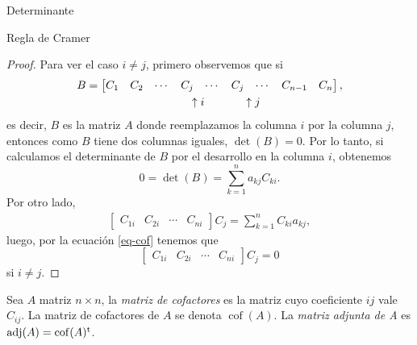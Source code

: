 \begin{chapter}{Determinante}
\begin{section}{Regla de Cramer}
\begin{proof}
            Para ver el caso $i \ne j$, primero observemos que si 
            \begin{align*}
            B &= \begin{bmatrix} C_1 & C_2&\cdots &C_j& \cdots &C_j & \cdots &C_{n-1}& C_{n}\end{bmatrix}, \\
            &\hspace{3.2cm} \uparrow i \hspace{1.2cm} \uparrow j
            \end{align*}
            es decir, $B$ es la matriz $A$ donde reemplazamos la columna $i$ por la columna $j$, entonces como $B$ tiene dos columnas iguales, $\det(B) =0$. Por lo tanto, si calculamos el determinante de $B$ por el desarrollo en la columna $i$, obtenemos
            \begin{equation} \label{eq-cof}
            0 = \det(B) = \sum_{k=1}^{n} a_{kj}C_{ki}.
            \end{equation}
            Por otro lado, 
            \begin{align*}
            \begin{bmatrix} C_{1i} & C_{2i} & \cdots & C_{ni}\end{bmatrix} C_j = \sum_{k=1}^{n} C_{ki}a_{kj},
            \end{align*}
            luego, por la ecuación \eqref{eq-cof} tenemos que 
            $$
            \begin{bmatrix} C_{1i} & C_{2i} & \cdots & C_{ni}\end{bmatrix} C_j =0
            $$
            si $i \ne j$.
            
        \end{proof}
        
        \begin{definicion} Sea $A$ matriz $n \times n$, la \textit{matriz de cofactores} es la matriz cuyo coeficiente $ij$ vale $C_{ij}$. La matriz de cofactores de $A$  se denota $\operatorname{cof}(A)$. La \textit{matriz adjunta de A} es $\operatorname{adj}(A) = \operatorname{cof}(A)^{\operatorname{t}}$.
        \end{definicion}
        

\end{section}
\end{chapter}

